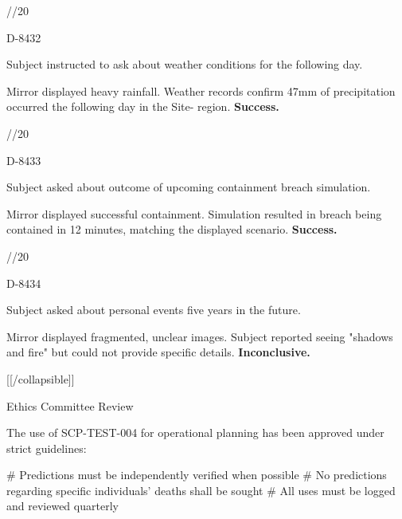 \begin{scpdialogue}

 \blackbox{}\blackbox{}/\blackbox{}\blackbox{}/20\blackbox{}\blackbox{}

 D-8432

 Subject instructed to ask about weather conditions for the following day.

 Mirror displayed heavy rainfall. Weather records confirm 47mm of precipitation occurred the following day in the Site-\blackbox{}\blackbox{} region. \textbf{Success.}

 \blackbox{}\blackbox{}/\blackbox{}\blackbox{}/20\blackbox{}\blackbox{}

 D-8433

 Subject asked about outcome of upcoming containment breach simulation.

 Mirror displayed successful containment. Simulation resulted in breach being contained in 12 minutes, matching the displayed scenario. \textbf{Success.}

 \blackbox{}\blackbox{}/\blackbox{}\blackbox{}/20\blackbox{}\blackbox{}

 D-8434

 Subject asked about personal events five years in the future.

 Mirror displayed fragmented, unclear images. Subject reported seeing "shadows and fire" but could not provide specific details. \textbf{Inconclusive.}

\end{scpdialogue}

\begin{scpquote}

\end{scpquote}

[[/collapsible]]


Ethics Committee Review

The use of SCP-TEST-004 for operational planning has been approved under strict guidelines:

\# Predictions must be independently verified when possible
\# No predictions regarding specific individuals' deaths shall be sought
\# All uses must be logged and reviewed quarterly


